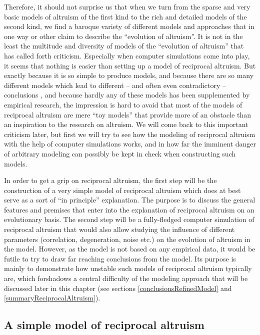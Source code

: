 Therefore, it should not surprise us that when we turn from the sparse and
very basic models of altruism of the first kind to the rich and detailed
models of the second kind, we find a baroque variety of different models and
approaches that in one way or other claim to describe the ``evolution of
altruism''. It is not in the least the multitude and diversity of models of
the ``evolution of altruism'' that has called forth criticism. Especially when
computer simulations come into play, it seems that nothing is easier than
setting up a model of reciprocal altruism. But exactly because it is so simple
to produce models, and because there are so many different models which lead
to different -- and often even contradictory -- conclusions \cite[p.\ 
198ff.]{binmore:1994} \cite[p.\ 42-44]{dugatkin:1998}, and because hardly any
of these models has been supplemented by empirical research, the impression is
hard to avoid that most of the models of reciprocal altruism are mere ``toy
models'' \cite[p.\  92]{hammerstein:2003a} that provide more of an obstacle
than an inspiration to the research on altruism. We will come back to this
important criticism later, but first we will try to see how the modeling of
reciprocal altruism with the help of computer simulations works, and in how
far the imminent danger of arbitrary modeling can possibly be kept in check
when constructing such models.

In order to get a grip on reciprocal altruism, the first step will be the
construction of a very simple model of reciprocal altruism which does at best
serve as a sort of ``in principle'' explanation. The purpose is to discuss the
general features and premises that enter into the explanation of reciprocal
altruism on an evolutionary basis. The second step will be a fully-fledged
computer simulation of reciprocal altruism that would also allow studying the
influence of different parameters (correlation, degeneration, noise etc.) on
the evolution of altruism in the model. However, as the model is not based on
any empirical data, it would be futile to try to draw far reaching conclusions
from the model. Its purpose is mainly to demonstrate how unstable such models
of reciprocal altruism typically are, which forshadows a central difficulty of
the modeling approach that will be discussed later in this chapter (see
sections \ref{conclusionsRefinedModel} and \ref{summaryReciprocalAltruism}).

\subsection{A simple model of reciprocal altruism}
\label{simpleModel}

